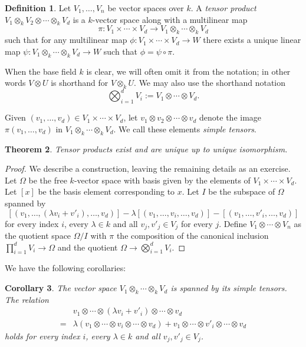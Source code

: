 \documentclass[12pt]{article}
\theoremstyle{plain}
\newtheorem{theorem}{Theorem}[section]
\newtheorem{corollary}[theorem]{Corollary}
\theoremstyle{definition}
\newtheorem{definition}[theorem]{Definition}
\theoremstyle{remark}
\numberwithin{equation}{section}
\begin{document}
\begin{definition}
Let $V_1,\ldots, V_n$ be vector spaces over $k$.
A \emph{tensor product} $V_1 \otimes_k V_2 \otimes \cdots \otimes_k V_d$
is a $k$-vector space along with a multilinear map
\[
\pi : V_1 \times \cdots \times V_d
\to  V_1 \otimes_k \cdots \otimes_k V_d
\]
such that for any multilinear map $\phi : V_1 \times \cdots \times V_d
\to W$ there exists a unique linear map
$\psi : V_1 \otimes_k \cdots \otimes_k V_d \to W$ such that
$\phi = \psi \circ \pi$.
\end{definition}

When the base field $k$ is clear, we will often omit it from the
notation; in other words $V \otimes U$ is shorthand for $V \otimes_k U$.
We may also use the shorthand notation
\[
\bigotimes_{i=1}^d V_i := V_1 \otimes \cdots \otimes V_d .
\]

Given $(v_1,\ldots, v_d) \in V_1 \times \cdots \times V_d$,
let $v_1 \otimes v_2 \otimes \cdots \otimes v_d$ denote the image
$\pi(v_1,\ldots,v_d)$ in $V_1 \otimes_k \cdots \otimes_k V_d$.
We call these elements \emph{simple tensors}.

\begin{theorem}
Tensor products exist and are unique up to unique isomorphism.
\end{theorem}

\begin{proof}
We describe a construction, leaving the remaining details as an exercise.
Let $\Omega$ be the free $k$-vector space with basis given by the elements of
$V_1 \times \cdots \times V_d$.  Let $[x]$ be the basis element
corresponding to $x$.
Let $I$ be the subspace of $\Omega$ spanned by
\[
[(v_1, \ldots, (\lambda v_i + v'_i), \ldots, v_d)]
-
\lambda[(v_1, \ldots,v_i, \ldots, v_d)] -
[(v_1, \ldots, v'_i, \ldots, v_d)]
\]
for every index $i$, every $\lambda \in k$ and all $v_j,v'_j \in V_j$
for every $j$.
Define $V_1 \otimes \cdots \otimes V_n$ as the quotient space
$\Omega/I$ with $\pi$ the composition of the canonical inclusion
$\prod_{i=1}^d V_i \to \Omega$ and the quotient $\Omega \to
\bigotimes_{i=1}^d V_i$.
\end{proof}

We have the following corollaries:

\begin{corollary}
The vector space $V_1 \otimes_k \cdots \otimes_k V_d$
is spanned by its simple tensors.
The relation
\begin{align*}
&v_1 \otimes \cdots \otimes (\lambda v_i + v'_i) \otimes \cdots \otimes
v_d\\
=&
\lambda(v_1 \otimes \cdots \otimes v_i \otimes \cdots \otimes v_d) +
v_1 \otimes \cdots \otimes v'_i \otimes \cdots \otimes v_d
\end{align*}
holds
for every index $i$, every $\lambda \in k$ and all $v_j,v'_j \in V_j$.
\end{corollary}
\end{document}
